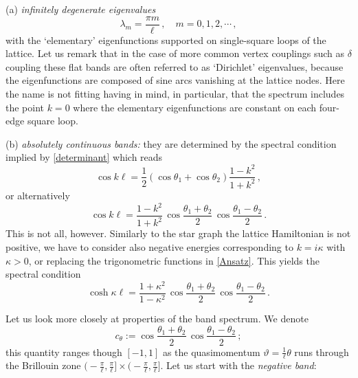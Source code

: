 \documentclass[english]{elsarticle}
\begin{document}
\medskip

\noindent (a) \emph{infinitely degenerate eigenvalues}
$$
\lambda_m = \frac{\pi m}{\ell}\,,\quad m=0,1,2,\cdots\,,
$$
with the `elementary' eigenfunctions supported on single-square loops of the lattice. Let us remark that in the case of more common vertex couplings such as $\delta$ coupling these flat bands are often referred to as `Dirichlet' eigenvalues, because the eigenfunctions are composed of sine arcs vanishing at the lattice nodes. Here the name is not fitting having in mind, in particular, that the spectrum includes the point $k=0$ where the elementary eigenfunctions are constant on each four-edge square loop.

\medskip

\noindent (b) \emph{absolutely continuous bands:} they are determined by the spectral condition implied by \eqref{determinant} which reads
$$
\cos k\ell = \frac12 (\cos\theta_1 + \cos\theta_2) \frac{1-k^2}{1+k^2}\,,
$$
or alternatively
\begin{equation} \label{speccon}
\cos k\ell = \frac{1-k^2}{1+k^2}\, \cos\frac{\theta_1+\theta_2}{2}\, \cos\frac{\theta_1-\theta_2}{2}\,.
\end{equation}
This is not all, however. Similarly to the star graph the lattice Hamiltonian is not positive, we have to consider also negative energies corresponding to $k=i\kappa$ with $\kappa>0$, or replacing the trigonometric functions in \eqref{Ansatz}. This yields the spectral condition
\begin{equation} \label{speccon<0}
\cosh \kappa\ell = \frac{1+\kappa^2}{1-\kappa^2}\, \cos\frac{\theta_1+\theta_2}{2}\, \cos\frac{\theta_1-\theta_2}{2}\,.
\end{equation}

Let us look more closely at properties of the band spectrum. We denote
$$
c_\theta:= \cos\frac{\theta_1+\theta_2}{2}\,
\cos\frac{\theta_1-\theta_2}{2}\,;
$$
this quantity ranges though $[-1,1]$ as the quasimomentum $\vartheta= \frac1\ell \theta$ runs through the Brillouin zone $\big(-\frac{\pi}{\ell}, \frac{\pi}{\ell}\big]\times\big(-\frac{\pi}{\ell},\frac{\pi}{\ell}\big]$. Let us start with the \emph{negative band}:
\end{document}
